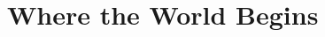 \documentclass[main.tex]{subfiles}
\begin{document}
	
\chapter{Where the World Begins} 
\label{C_chapter1}
\end{document}
